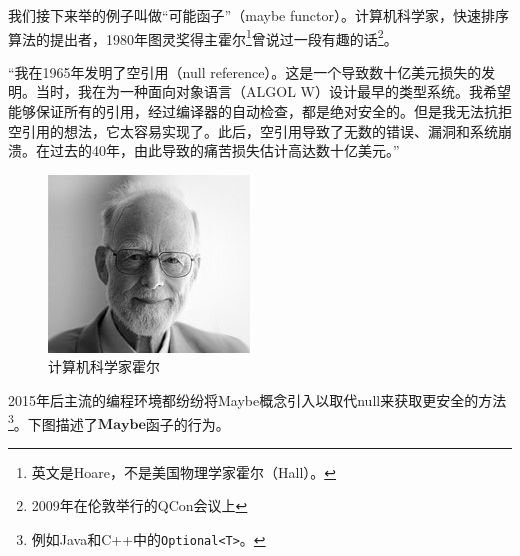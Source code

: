 \documentclass[b5paper]{ctexart}
\begin{document}
\begin{example}
 
我们接下来举的例子叫做“可能函子”（maybe functor）。计算机科学家，快速排序算法的提出者，1980年图灵奖得主霍尔\footnote{英文是Hoare，不是美国物理学家霍尔（Hall）。}曾说过一段有趣的话\footnote{2009年在伦敦举行的QCon会议上}。

“我在1965年发明了空引用（null reference）。这是一个导致数十亿美元损失的发明。当时，我在为一种面向对象语言（ALGOL W）设计最早的类型系统。我希望能够保证所有的引用，经过编译器的自动检查，都是绝对安全的。但是我无法抗拒空引用的想法，它太容易实现了。此后，空引用导致了无数的错误、漏洞和系统崩溃。在过去的40年，由此导致的痛苦损失估计高达数十亿美元。”\cite{Wiki-Hoare}


\begin{figure}[htbp]
 \centering
 \includegraphics[scale=1]{img/Hoare.jpg}
 \captionsetup{labelformat=empty}
 \caption{计算机科学家霍尔}
 \label{fig:Hoare}
\end{figure}

2015年后主流的编程环境都纷纷将Maybe概念引入以取代null来获取更安全的方法\footnote{例如Java和C++中的\lstinline{Optional<T>}。}。下图描述了$\mathbf{Maybe}$函子的行为。

\begin{center}
\end{center}


\end{example}
\end{document}
